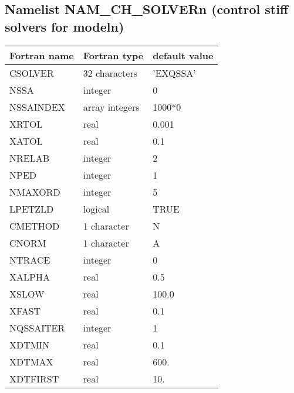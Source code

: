 
\subsection{Namelist NAM\_CH\_SOLVERn (control stiff solvers for modeln)}
 
\begin{longtable} {|p{}|p{}|p{}|}
\hline
Fortran name &  Fortran type & default value \\
\hline 
\endhead
\hline
\endfoot
CSOLVER 	&32 characters 	&'EXQSSA'\\
NSSA 		&integer 	&0\\
NSSAINDEX 	&array integers &1000*0\\
XRTOL 		&real 		&0.001\\
XATOL 		&real 		&0.1\\
NRELAB 		&integer 	&2\\
NPED 		&integer 	&1\\
NMAXORD 	&integer 	&5\\
LPETZLD 	&logical 	&TRUE\\
CMETHOD 	&1 character 	&N\\
CNORM 		&1 character 	&A\\
NTRACE 		&integer 	&0\\
XALPHA 		&real 		&0.5\\
XSLOW 		&real 		&100.0\\
XFAST 		&real 		&0.1\\
NQSSAITER 	&integer 	&1\\
XDTMIN 		&real	 	&0.1\\
XDTMAX 		&real	 	&600.\\
XDTFIRST 	&real 		&10.\\
\end{longtable}

